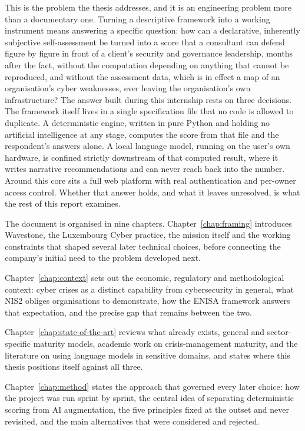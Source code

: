 This is the problem the thesis addresses, and it is an engineering problem more
than a documentary one. Turning a descriptive framework into a working
instrument means answering a specific question: how can a declarative,
inherently subjective self-assessment be turned into a score that a consultant
can defend figure by figure in front of a client's security and governance
leadership, months after the fact, without the computation depending on
anything that cannot be reproduced, and without the assessment data, which is
in effect a map of an organisation's cyber weaknesses, ever leaving the
organisation's own infrastructure? The answer built during this internship
rests on three decisions. The framework itself lives in a single specification
file that no code is allowed to duplicate. A deterministic engine, written in
pure Python and holding no artificial intelligence at any stage, computes the
score from that file and the respondent's answers alone. A local language
model, running on the user's own hardware, is confined strictly downstream of
that computed result, where it writes narrative recommendations and can never
reach back into the number. Around this core sits a full web platform with real
authentication and per-owner access control. Whether that answer holds, and
what it leaves unresolved, is what the rest of this report examines.

The document is organised in nine chapters. Chapter~\ref{chap:framing}
introduces Wavestone, the Luxembourg Cyber practice, the mission itself and the
working constraints that shaped several later technical choices, before
connecting the company's initial need to the problem developed next.

Chapter~\ref{chap:context} sets out the economic, regulatory and methodological
context: cyber crises as a distinct capability from cybersecurity in general,
what NIS2 obliges organisations to demonstrate, how the ENISA framework answers
that expectation, and the precise gap that remains between the two.

Chapter~\ref{chap:state-of-the-art} reviews what already exists, general and
sector-specific maturity models, academic work on crisis-management maturity,
and the literature on using language models in sensitive domains, and states
where this thesis positions itself against all three.

Chapter~\ref{chap:method} states the approach that governed every later choice:
how the project was run sprint by sprint, the central idea of separating
deterministic scoring from AI augmentation, the five principles fixed at the
outset and never revisited, and the main alternatives that were considered and
rejected.

